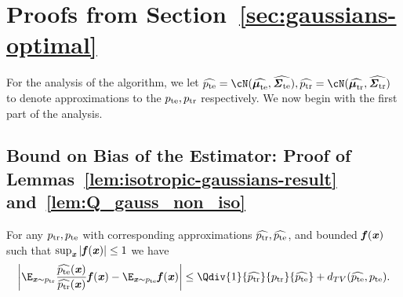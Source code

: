 

\section{Proofs from Section~\ref{sec:gaussians-optimal}}\label{sec:ProofsGauss}




 For the analysis of the algorithm, we let $\widehat{\pte} = \cN(\widehat{\mte},\widehat{\ste}),\widehat{\ptr} = \cN(\widehat{\mtr},\widehat{\str})$ to denote approximations to the $p_{\mathrm{te}},p_{\mathrm{tr}}$ respectively.  We now begin with the first part of the analysis.

\subsection*{Bound on Bias of the Estimator: Proof of Lemmas~\ref{lem:isotropic-gaussians-result} and~\ref{lem:Q_gauss_non_iso}}
\begin{lemma}
\label{cor:approx-Q}
For any $p_{\mathrm{tr}},p_{\mathrm{te}}$ with corresponding approximations $\widehat{p_{\mathrm{tr}}}, \widehat{p_{\mathrm{te}}}$, and bounded $\boldsymbol{\mathit{f}}(\boldsymbol{\mathit{x}})$ such that $\sup_{\boldsymbol{\mathit{x}}}|\boldsymbol{\mathit{f}}(\boldsymbol{\mathit{x}})|\leq 1$ we have
\begin{equation*}
    \left|\E_{\xx\sim \ptr} \frac{\widehat{\pte}(\xx)}{\widehat{\ptr}(\xx)} \ff(\xx) - \E_{\xx \sim \pte} \ff(\xx)\right|  \leq \Qdiv{1}{\widehat{\ptr}}{\ptr}{\widehat{\pte}} + d_{TV}(\widehat{\pte}, \pte).
\end{equation*}
\end{lemma}
